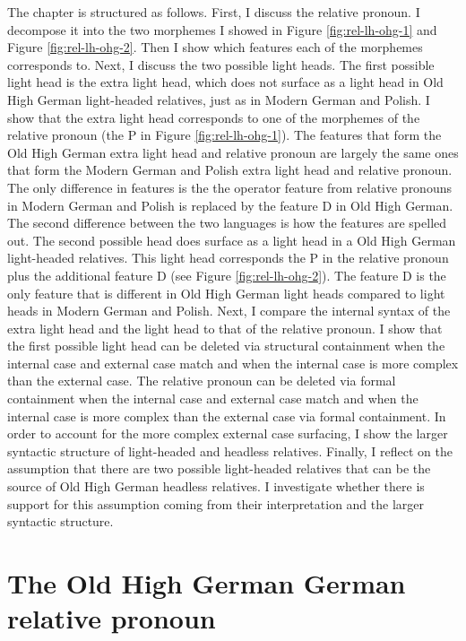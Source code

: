 The chapter is structured as follows.
First, I discuss the relative pronoun. I decompose it into the two morphemes I showed in Figure \ref{fig:rel-lh-ohg-1} and Figure \ref{fig:rel-lh-ohg-2}. Then I show which features each of the morphemes corresponds to.
Next, I discuss the two possible light heads. The first possible light head is the extra light head, which does not surface as a light head in Old High German light-headed relatives, just as in Modern German and Polish. I show that the extra light head corresponds to one of the morphemes of the relative pronoun (the P in Figure \ref{fig:rel-lh-ohg-1}).
The features that form the Old High German extra light head and relative pronoun are largely the same ones that form the Modern German and Polish extra light head and relative pronoun. The only difference in features is the the  operator feature from relative pronouns in Modern German and Polish is replaced by the feature D in Old High German. The second difference between the two languages is how the features are spelled out.
The second possible head does surface as a light head in a Old High German light-headed relatives. This light head corresponds the P in the relative pronoun plus the additional feature D (see Figure \ref{fig:rel-lh-ohg-2}). The feature D is the only feature that is different in Old High German light heads compared to light heads in Modern German and Polish.
Next, I compare the internal syntax of the extra light head and the light head to that of the relative pronoun. I show that the first possible light head can be deleted via structural containment when the internal case and external case match and when the internal case is more complex than the external case. The relative pronoun can be deleted via formal containment when the internal case and external case match and when the internal case is more complex than the external case via formal containment.
In order to account for the more complex external case surfacing, I show the larger syntactic structure of light-headed and headless relatives.
Finally, I reflect on the assumption that there are two possible light-headed relatives that can be the source of Old High German headless relatives. I investigate whether there is support for this assumption coming from their interpretation and the larger syntactic structure.

\section{The Old High German German relative pronoun}\label{sec:ohg-rel}

